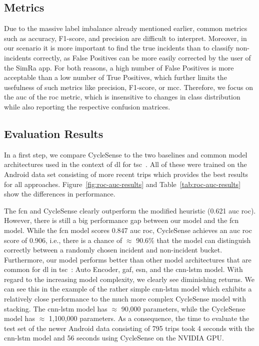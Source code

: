 \subsection{Metrics}
\label{subsec:metrics}
Due to the massive label imbalance already mentioned earlier, common metrics such as accuracy, F1-score, and precision are difficult to interpret.
Moreover, in our scenario it is more important to find the true incidents than to classify non-incidents correctly, as False Positives can be more easily corrected by the user of the SimRa app.
For both reasons, a high number of False Positives is more acceptable than a low number of True Positives, which further limits the usefulness of such metrics like precision, F1-score, or \ac{mcc}.
Therefore, we focus on the \ac{auc} of the \ac{roc} metric, which is insensitive to changes in class distribution~\cite{fawcett2006introduction} while also reporting the respective confusion matrices.

\subsection{Evaluation Results}
\label{subsec:evaluation_results}
In a first step, we compare CycleSense to the two baselines and common model architectures used in the context of \ac{dl} for \ac{tsc}~\cite{ismail2019deep}.
All of these were trained on the Android data set consisting of more recent trips which provides the best results for all approaches.
Figure~\ref{fig:roc-auc-results} and Table~\ref{tab:roc-auc-results} show the differences in performance.

The \ac{fcn} and CycleSense clearly outperform the modified heuristic (0.621 \ac{auc} \ac{roc}).
However, there is still a big performance gap between our model and the \ac{fcn} model.
While the \ac{fcn} model scores 0.847 \ac{auc} \ac{roc}, CycleSense achieves an \ac{auc} \ac{roc} score of 0.906, i.e., there is a chance of $\approx$ 90.6\% that the model can distinguish correctly between a randomly chosen incident and non-incident bucket.
Furthermore, our model performs better than other model architectures that are common for \ac{dl} in \ac{tsc}~\cite{ismail2019deep}: Auto Encoder, \ac{gaf}, \ac{esn}, and the \ac{cnn}-\ac{lstm} model.
With regard to the increasing model complexity, we clearly see diminishing returns.
We can see this in the example of the rather simple \ac{cnn}-\ac{lstm} model which exhibits a relatively close performance to the much more complex CycleSense model with stacking.
The \ac{cnn}-\ac{lstm} model has $\approx$ 90,000 parameters, while the CycleSense model has $\approx$ 1,100,000 parameters.
As a consequence, the time to evaluate the test set of the newer Android data consisting of 795 trips took 4 seconds with the \ac{cnn}-\ac{lstm} model and 56 seconds using CycleSense on the NVIDIA GPU.

